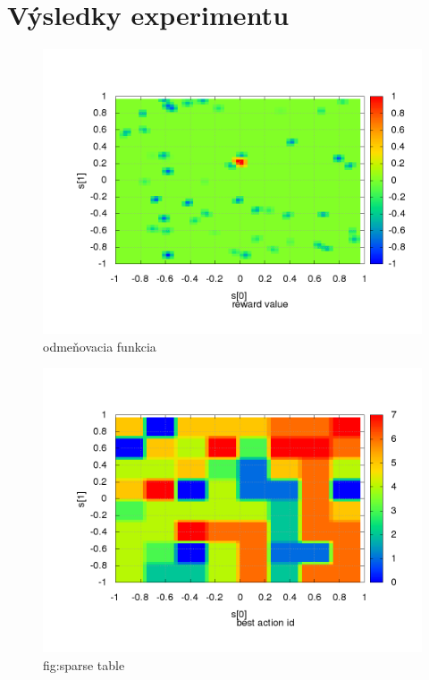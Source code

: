 \section {Výsledky experimentu}



\begin{figure}[!htb]
\centering
\includegraphics[scale=.4]{../../results_q_learning/map_1/reward_value_surface.png}
\caption{odmeňovacia funkcia}
\end{figure}



\begin{figure}[!htb]
\centering
\includegraphics[scale=.7]{../../results_q_learning/map_1/function_type_1/iterations_10/action_best_value_log_surface.png}
\caption{fig:sparse table}
\end{figure}

